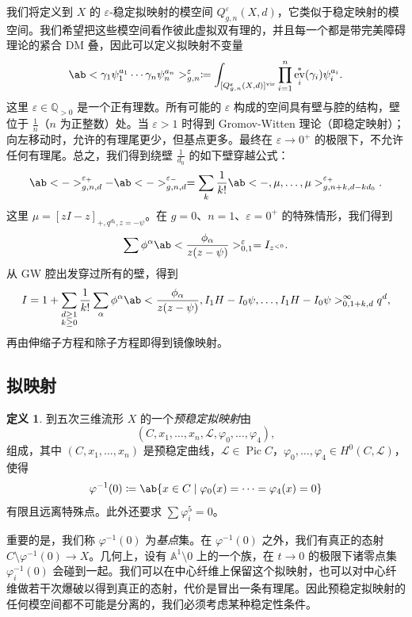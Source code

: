 \documentclass{amsart}
\theoremstyle{definition}
\newtheorem{defn}[thm]{定义}
\theoremstyle{remark}
\theoremstyle{plain}
\theoremstyle{definition}
\theoremstyle{remark}
\newcommand{\A}{\mathbb{A}}
\newcommand{\Q}{\mathbb{Q}}
\newcommand{\ep}{\varepsilon}
\newcommand{\mc}[1]{\mathcal{#1}}
\newcommand{\mr}[1]{\mathrm{#1}}
\newcommand{\1}{\mathbf{1}}
\newcommand{\2}{\mathbf{2}}
\newcommand{\3}{\mathbf{3}}
\newcommand{\vir}{\mr{vir}}
\DeclareMathOperator{\Pic}{Pic}
\DeclareMathOperator{\ev}{ev}
\begin{document}
我们将定义到 \(X\) 的 \(\ep\)-稳定拟映射的模空间 \(Q_{g,n}^{\ep}(X, d)\)，它类似于稳定映射的模空间。我们希望把这些模空间看作彼此虚拟双有理的，并且每一个都是带完美障碍理论的紧合 DM 叠，因此可以定义拟映射不变量
\[ \ab< \gamma_1 \psi_1^{a_1} \cdots \gamma_n \psi_n^{a_n}>_{g,n}^{\ep} \coloneqq \int_{[Q_{g,n}^{\ep}(X,d)]^{\vir}} \prod_{i=1}^n \ev_i^*(\gamma_i) \psi_i^{a_i}. \]
这里 \(\ep \in \Q_{>0}\) 是一个正有理数。所有可能的 \(\ep\) 构成的空间具有壁与腔的结构，壁位于 \(\frac{1}{n}\)（\(n\) 为正整数）处。当 \(\ep > 1\) 时得到 Gromov-Witten 理论（即稳定映射）；向左移动时，允许的有理尾更少，但基点更多。最终在 \(\ep \to 0^+\) 的极限下，不允许任何有理尾。总之，我们得到绕壁 \(\frac{1}{d_0}\) 的如下壁穿越公式：
\[ \ab<->_{g,n,d}^{\ep_+} - \ab<->_{g,n,d}^{\ep_-} = \sum_{k} \frac{1}{k!} \ab<-, \mu, \ldots, \mu>_{g,n+k, d-kd_0}^{\ep_+}. \]
这里 \(\mu = [zI-z]_{+, q^{d_0}, z=-\psi}\)。在 \(g = 0\)、\(n = 1\)、\(\ep = 0^+\) 的特殊情形，我们得到
\[ \sum \phi^{\alpha} \ab<\frac{\phi_{\alpha}}{z(z-\psi)}>^{\ep}_{0,1} = I_{z^{<0}}. \]
从 GW 腔出发穿过所有的壁，得到
\[ I = 1 + \sum_{\substack{d \geq 1 \\ k \geq 0}} \frac{1}{k!} \sum_{\alpha} \phi^{\alpha} \ab< \frac{\phi_{\alpha}}{z(z-\psi)}, I_1 H - I_0 \psi, \ldots, I_1 H - I_0 \psi>_{0,1+k,d}^{\infty} q^d, \]
再由伸缩子方程和除子方程即得到镜像映射。

\subsection{拟映射}%
\label{sub:Quasimaps}

\begin{defn}
    到五次三维流形 \(X\) 的一个\textit{预稳定拟映射}由
    \[(C, x_1, \ldots, x_n, \mc{L}, \varphi_0, \ldots, \varphi_4),\] 
    组成，其中 \((C, x_1, \ldots, x_n)\) 是预稳定曲线，\(\mc{L} \in \Pic C\)，\(\varphi_0, \ldots, \varphi_4 \in H^0(C, \mc{L})\)，使得
    \[ \varphi^{-1}(0) \coloneqq \ab\{x \in C \mid \varphi_0(x) = \cdots = \varphi_4(x) = 0 \} \]
    有限且远离特殊点。此外还要求 \(\sum \varphi_i^5 = 0\)。
\end{defn}

重要的是，我们称 \(\varphi^{-1}(0)\) 为\textit{基点}集。在 \(\varphi^{-1}(0)\) 之外，我们有真正的态射 \(C \setminus \varphi^{-1}(0) \to X\)。几何上，设有 \(\A^1 \setminus 0\) 上的一个族，在 \(t \to 0\) 的极限下诸零点集 \(\varphi_i^{-1}(0)\) 会碰到一起。我们可以在中心纤维上保留这个拟映射，也可以对中心纤维做若干次爆破以得到真正的态射，代价是冒出一条有理尾。因此预稳定拟映射的任何模空间都不可能是分离的，我们必须考虑某种稳定性条件。
\end{document}
